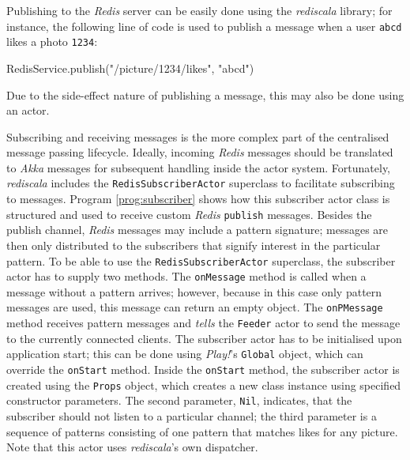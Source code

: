 Publishing to the \textit{Redis} server can be easily done using the \textit{rediscala} library; for instance, the following line of code is used to publish a message when a user \texttt{abcd} likes a photo \texttt{1234}:
\begin{JavaCode}
RedisService.publish("/picture/1234/likes", "abcd")
\end{JavaCode}
Due to the side-effect nature of publishing a message, this may also be done using an actor. 

Subscribing and receiving messages is the more complex part of the centralised message passing lifecycle. Ideally, incoming \textit{Redis} messages should be translated to \textit{Akka} messages for subsequent handling inside the actor system. Fortunately, \textit{rediscala} includes the \texttt{RedisSubscriberActor} superclass to facilitate subscribing to messages. Program \ref{prog:subscriber} shows how this subscriber actor class is structured and used to receive custom \textit{Redis} \texttt{publish} messages. Besides the publish channel, \textit{Redis} messages may include a pattern signature; messages are then only distributed to the subscribers that signify interest in the particular pattern. To be able to use the \texttt{RedisSubscriberActor} superclass, the subscriber actor has to supply two methods. The \texttt{onMessage} method is called when a message without a pattern arrives; however, because in this case only pattern messages are used, this message can return an empty object. The \texttt{onPMessage} method receives pattern messages and \textit{tells} the \texttt{Feeder} actor to send the message to the currently connected clients. The subscriber actor has to be initialised upon application start; this can be done using \textit{Play!}'s \texttt{Global} object, which can override the \texttt{onStart} method. Inside the \texttt{onStart} method, the subscriber actor is created using the \texttt{Props} object, which creates a new class instance using specified constructor parameters. The second parameter, \texttt{Nil}, indicates, that the subscriber should not listen to a particular channel; the third parameter is a sequence of patterns consisting of one pattern that matches likes for any picture. Note that this actor uses \textit{rediscala}'s own dispatcher.

